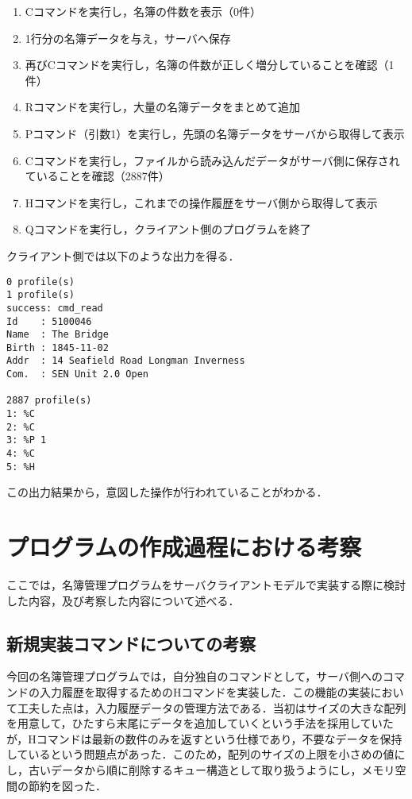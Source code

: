 \documentclass[11pt]{jsarticle}
\begin{document}
\begin{enumerate}
      \item Cコマンドを実行し，名簿の件数を表示（0件）
      \item 1行分の名簿データを与え，サーバへ保存
      \item 再びCコマンドを実行し，名簿の件数が正しく増分していることを確認（1件）
      \item Rコマンドを実行し，大量の名簿データをまとめて追加
      \item Pコマンド（引数1）を実行し，先頭の名簿データをサーバから取得して表示
      \item Cコマンドを実行し，ファイルから読み込んだデータがサーバ側に保存されていることを確認（2887件）
      \item Hコマンドを実行し，これまでの操作履歴をサーバ側から取得して表示
      \item Qコマンドを実行し，クライアント側のプログラムを終了
\end{enumerate}

クライアント側では以下のような出力を得る．

\begin{verbatim}
0 profile(s)
1 profile(s)
success: cmd_read
Id    : 5100046
Name  : The Bridge
Birth : 1845-11-02
Addr  : 14 Seafield Road Longman Inverness
Com.  : SEN Unit 2.0 Open

2887 profile(s)
1: %C
2: %C
3: %P 1
4: %C
5: %H
\end{verbatim}

この出力結果から，意図した操作が行われていることがわかる．

\section{プログラムの作成過程における考察}

ここでは，名簿管理プログラムをサーバクライアントモデルで実装する際に検討した内容，及び考察した内容について述べる．

\subsection{新規実装コマンドについての考察}

今回の名簿管理プログラムでは，自分独自のコマンドとして，サーバ側へのコマンドの入力履歴を取得するためのHコマンドを実装した．この機能の実装において工夫した点は，入力履歴データの管理方法である．当初はサイズの大きな配列を用意して，ひたすら末尾にデータを追加していくという手法を採用していたが，Hコマンドは最新の数件のみを返すという仕様であり，不要なデータを保持しているという問題点があった．このため，配列のサイズの上限を小さめの値にし，古いデータから順に削除するキュー構造として取り扱うようにし，メモリ空間の節約を図った．
\end{document}
